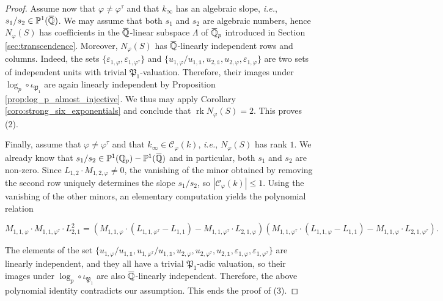 \documentclass[12pt]{amsart}
\newcommand{\Q}{\mathbb{Q}}
\newcommand\bP{\mathbb{P}}
\newcommand\Qp{{\mathbb{Q}_p}}
\newcommand\gP{\mathfrak{P}}
\newcommand\sC{\mathscr{C}}
\newcommand{\ob}[1]{\mkern 1.5mu\overline{\mkern-1.5mu#1\mkern-1.5mu}\mkern 1.5mu}
\DeclareMathOperator{\rk}{rk}
\theoremstyle{defstyle}
\theoremstyle{thmstyle}
\begin{document}
\begin{proof}
		Assume now that $\varphi\neq \varphi^\tau$ and that $k_\infty$ has an algebraic slope, \textit{i.e.}, $s_1/s_2 \in \bP^1(\ob{\Q})$. We may assume that both $s_1$ and $s_2$ are algebraic numbers,  hence $N_\varphi(S)$ has coefficients in the $\ob{\Q}$-linear subspace $\Lambda$ of $\ob{\Q}_p$ introduced in Section \ref{sec:transcendence}. Moreover, $N_\varphi(S)$ has $\ob{\Q}$-linearly independent rows and columns. Indeed, the sets $\{\varepsilon_{1,\varphi},\varepsilon_{1,\varphi^\tau}\}$ and $\{u_{1,\varphi}/u_{1,\mathds{1}},u_{2,\mathds{1}},u_{2,\varphi},\varepsilon_{1,\varphi}\}$ are 
		two sets of independent units with trivial $\gP_1$-valuation. Therefore, their images under $\log_p \circ \iota_{\gP_1}$ are again linearly independent by Proposition \ref{prop:log_p_almost_injective}. We thus may apply Corollary \ref{coro:strong_six_exponentials} and conclude that $\rk N_\varphi(S)=2$.  This proves (2).
		
		Finally, assume that $\varphi\neq \varphi^\tau$ and that $k_\infty\in \sC_\varphi(k)$, \textit{i.e.}, $N_\varphi(S)$ has rank $1$. We already know that $s_1/s_2\in \bP^1(\Qp)-\bP^1(\ob{\Q})$ and in particular, both $s_1$ and $s_2$ are non-zero. Since $L_{1,2}\cdot M_{1,2,\varphi}\neq 0$, the vanishing of the minor obtained by removing the second row uniquely determines the slope $s_1/s_2$, so $|\sC_\varphi(k)|\leq 1$. Using the vanishing of the other minors, an elementary computation yields the polynomial relation 
		{\small
			\[M_{1,1,\varphi}\cdot M_{1,1,\varphi^\tau}\cdot L_{2,1}^2 =\left(M_{1,1,\varphi}\cdot (L_{1,1,\varphi^\tau}-L_{1,1}) - M_{1,1,\varphi^\tau}\cdot L_{2,1,\varphi}\right)  \left(M_{1,1,\varphi^\tau}\cdot (L_{1,1,\varphi}-L_{1,1}) - M_{1,1,\varphi}\cdot L_{2,1,\varphi^\tau}\right). \]
			\par}
		The elements of the set $\{u_{1,\varphi}/u_{1,\mathds{1}},u_{1,\varphi^\tau}/u_{1,\mathds{1}},u_{2,\varphi},u_{2,\varphi^\tau},u_{2,\mathds{1}},\varepsilon_{1,\varphi},\varepsilon_{1,\varphi^\tau}\}$ are linearly independent, and they all have a trivial $\gP_1$-adic valuation, so their images under $\log_p\circ \iota_{\gP_1}$ are also $\ob{\Q}$-linearly independent. Therefore, the above polynomial identity contradicts our assumption. This ends the proof of (3).
	\end{proof}
	
	
	
	
\end{document}
